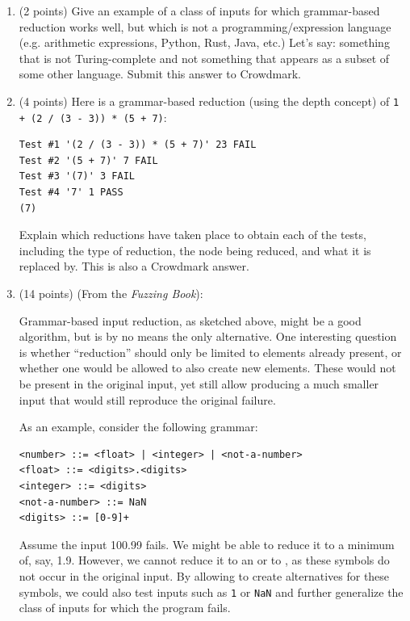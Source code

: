 \begin{enumerate}[label=(\alph*)]
\item (2 points) Give an example of a class of inputs for which grammar-based reduction works well, but which is not a
programming/expression language (e.g. arithmetic expressions, Python, Rust, Java, etc.) Let's say: something that is not
Turing-complete and not something that appears as a subset of some other language. Submit this answer to Crowdmark.

\item (4 points)
Here is a grammar-based reduction (using the depth concept) of \texttt{1 + (2 / (3 - 3)) * (5 + 7)}:
\begin{verbatim}
Test #1 '(2 / (3 - 3)) * (5 + 7)' 23 FAIL
Test #2 '(5 + 7)' 7 FAIL
Test #3 '(7)' 3 FAIL
Test #4 '7' 1 PASS
(7)
\end{verbatim}
Explain which reductions have taken place to obtain each of the tests, including the type of reduction, the node
being reduced, and what it is replaced by. This is also a Crowdmark answer.


\item (14 points) (From the \emph{Fuzzing Book}):

Grammar-based input reduction, as sketched above, might be a good algorithm, but is by no means the only alternative. One interesting question is whether ``reduction'' should only be limited to elements already present, or whether one would be allowed to also create new elements. These would not be present in the original input, yet still allow producing a much smaller input that would still reproduce the original failure.

As an example, consider the following grammar:

\begin{verbatim}
<number> ::= <float> | <integer> | <not-a-number>
<float> ::= <digits>.<digits>
<integer> ::= <digits>
<not-a-number> ::= NaN
<digits> ::= [0-9]+
\end{verbatim}

Assume the input 100.99 fails. We might be able to reduce it to a minimum of, say, 1.9. However, we cannot reduce it to an  or to , as these symbols do not occur in the original input. By allowing to create alternatives for these symbols, we could also test inputs such as \texttt{1} or \texttt{NaN} and further generalize the class of inputs for which the program fails.


\end{enumerate}
